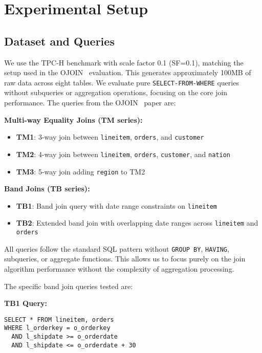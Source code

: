 \section{Experimental Setup}

\subsection{Dataset and Queries}

We use the TPC-H benchmark with scale factor 0.1 (SF=0.1), matching the setup used in the OJOIN~\cite{hu2025optimal} evaluation. This generates approximately 100MB of raw data across eight tables. We evaluate pure \texttt{SELECT-FROM-WHERE} queries without subqueries or aggregation operations, focusing on the core join performance. The queries from the OJOIN~\cite{hu2025optimal} paper are:

\textbf{Multi-way Equality Joins (TM series):}
\begin{itemize}
\item \textbf{TM1}: 3-way join between \texttt{lineitem}, \texttt{orders}, and \texttt{customer}
\item \textbf{TM2}: 4-way join between \texttt{lineitem}, \texttt{orders}, \texttt{customer}, and \texttt{nation}
\item \textbf{TM3}: 5-way join adding \texttt{region} to TM2
\end{itemize}

\textbf{Band Joins (TB series):}
\begin{itemize}
\item \textbf{TB1}: Band join query with date range constraints on \texttt{lineitem}
\item \textbf{TB2}: Extended band join with overlapping date ranges across \texttt{lineitem} and \texttt{orders}
\end{itemize}

All queries follow the standard SQL pattern without \texttt{GROUP BY}, \texttt{HAVING}, subqueries, or aggregate functions. This allows us to focus purely on the join algorithm performance without the complexity of aggregation processing.

The specific band join queries tested are:

\textbf{TB1 Query:}
\begin{verbatim}
SELECT * FROM lineitem, orders
WHERE l_orderkey = o_orderkey
  AND l_shipdate >= o_orderdate
  AND l_shipdate <= o_orderdate + 30
\end{verbatim}

